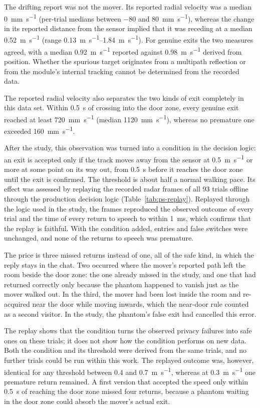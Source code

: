 The drifting report was not the mover. Its reported radial velocity was a
median \SI{0}{\milli\metre\per\second} (per-trial medians between
\SI{-80}{} and \SI{80}{\milli\metre\per\second}), whereas the change in its
reported distance from the sensor implied that it was receding at a median
\SI{0.52}{\metre\per\second} (range \SIrange{0.13}{1.84}{\metre\per\second}).
For genuine exits the two measures agreed, with a median
\SI{0.92}{\metre\per\second} reported against \SI{0.98}{\metre\per\second}
derived from position. Whether the spurious target originates from a multipath
reflection or from the module's internal tracking cannot be determined from
the recorded data.

The reported radial velocity also separates the two kinds of exit completely
in this data set. Within \SI{0.5}{\second} of crossing into the door zone,
every genuine exit reached at least \SI{720}{\milli\metre\per\second} (median
\SI{1120}{\milli\metre\per\second}), whereas no premature one exceeded
\SI{160}{\milli\metre\per\second}.

After the study, this observation was turned into a condition in the decision
logic: an exit is accepted only if the track moves away from the sensor at
\SI{0.5}{\metre\per\second} or more at some point on its way out, from
\SI{0.5}{\second} before it reaches the door zone until the exit is confirmed.
The threshold is about half a normal walking pace. Its effect was assessed by
replaying the recorded radar frames of all 93 trials offline through the
production decision logic (Table~\ref{tab:ps-replay}). Replayed through the
logic used in the study, the frames reproduced the observed outcome of every
trial and the time of every return to speech to within \SI{1}{\milli\second},
which confirms that the replay is faithful. With the condition added, entries
and false switches were unchanged, and none of the returns to speech was
premature.

The price is three missed returns instead of one, all of the safe kind, in
which the reply stays in the chat. Two occurred where the mover's reported path
left the room beside the door zone: the one already missed in the study, and
one that had returned correctly only because the phantom happened to vanish
just as the mover walked out. In the third, the mover had been lost inside the
room and re-acquired near the door while moving inwards, which the near-door
rule counted as a second visitor. In the study, the phantom's false exit had
cancelled this error.

The replay shows that the condition turns the observed privacy failures into
safe ones on these trials; it does not show how the condition performs on new
data. Both the condition and its threshold were derived from the same trials,
and no further trials could be run within this work. The replayed outcome was,
however, identical for any threshold between \SI{0.4}{} and
\SI{0.7}{\metre\per\second}, whereas at \SI{0.3}{\metre\per\second} one
premature return remained. A first version that accepted the speed only within
\SI{0.5}{\second} of reaching the door zone missed four returns, because a
phantom waiting in the door zone could absorb the mover's actual exit.

